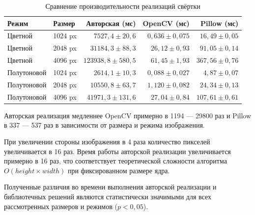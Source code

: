 \documentclass[a4paper, 12pt]{article}
\begin{document}
\begin{table}[h]

\centering

\caption{Сравнение производительности реализаций свёртки}

\label{tab:performance}

\begin{tabular}{llrrr}

    \toprule

    \textbf{Режим} & \textbf{Размер} & \textbf{Авторская (мс)} & \textbf{OpenCV (мс)} & \textbf{Pillow (мс)} \\

    \midrule

    Цветной & 1024 px & $7527{,}4 \pm 20{,}6$ & $0{,}636 \pm 0{,}075$ & $16{,}49 \pm 0{,}05$ \\

    Цветной & 2048 px & $31184{,}3 \pm 88{,}3$ & $26{,}12 \pm 0{,}93$ & $91{,}05 \pm 0{,}14$ \\

    Цветной & 4096 px & $123938{,}8 \pm 580{,}5$ & $61{,}45 \pm 1{,}93$ & $367{,}56 \pm 0{,}76$ \\

    Полутоновой & 1024 px & $2614{,}1 \pm 10{,}3$ & $0{,}088 \pm 0{,}027$ & $4{,}87 \pm 0{,}07$ \\

    Полутоновой & 2048 px & $10550{,}8 \pm 63{,}7$ & $1{,}120 \pm 0{,}082$ & $24{,}34 \pm 0{,}13$ \\

    Полутоновой & 4096 px & $41971{,}3 \pm 131{,}6$ & $27{,}04 \pm 0{,}84$ & $107{,}61 \pm 0{,}61$ \\

    \bottomrule

\end{tabular}

\end{table}

Авторская реализация медленнее OpenCV примерно в 1194 --- 29800 раз и Pillow в 337 --- 537 раз в зависимости от размера и режима изображения.

При увеличении стороны изображения в 4 раза количество пикселей увеличивается в 16 раз. Время работы авторской реализации увеличивается примерно в 16 раз, что соответствует теоретической сложности алгоритма $O(height\times width)$ при фиксированном размере ядра.

Полученные различия во времени выполнения авторской реализации и библиотечных решений являются статистически значимыми для всех рассмотренных размеров и режимов ($p < 0{,}05$).
\end{document}
